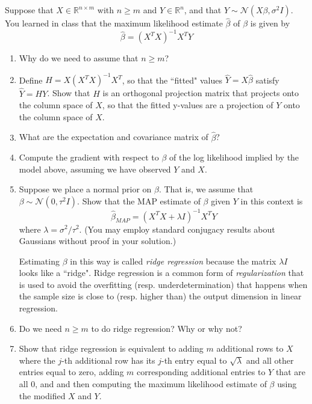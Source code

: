 \documentclass[submit]{harvardml}
\newcommand{\R}{\mathbb{R}}
\newcommand{\N}{\mathcal{N}}
\theoremstyle{plain}
\begin{document}
\begin{problem}
Suppose that $X \in \R^{n \times m}$ with $n \geq m$ and $Y \in \R^n$, and that $Y \sim \N(X\beta, \sigma^2 I)$. You learned in class that the maximum likelihood estimate $\hat\beta$ of $\beta$ is given by
\[
\hat\beta = (X^TX)^{-1}X^TY
\]
\begin{enumerate}[label=(\alph*)]
\item Why do we need to assume that $n \geq m$?
\item Define $H = X(X^TX)^{-1}X^T$, so that the ``fitted" values $\hat Y = X\hat{\beta}$ satisfy $\hat Y = HY$. Show that $H$ is an orthogonal projection matrix that projects onto the column space of $X$, so that the fitted y-values are a projection of $Y$ onto the column space of $X$.
\item What are the expectation and covariance matrix of $\hat\beta$?
\item Compute the gradient with respect to $\beta$ of the log likelihood implied by the model above, assuming we have observed $Y$ and $X$.
\item Suppose we place a normal prior on $\beta$. That is, we assume that $\beta \sim \N(0, \tau^2 I)$. Show that the MAP estimate of $\beta$ given $Y$ in this context is
\[
\hat \beta_{MAP} = (X^TX + \lambda I)^{-1}X^T Y
\]
where $\lambda = \sigma^2 / \tau^2$. (You may employ standard conjugacy results about Gaussians without proof in your solution.)

Estimating $\beta$ in this way is called {\em ridge regression} because the matrix $\lambda I$ looks like a ``ridge". Ridge regression is a common form of {\em regularization} that is used to avoid the overfitting (resp. underdetermination) that happens when the sample size is close to (resp. higher than) the output dimension in linear regression.
\item Do we need $n \geq m$ to do ridge regression? Why or why not?
\item Show that ridge regression is equivalent to adding $m$ additional rows to $X$ where the $j$-th additional row has its $j$-th entry equal to $\sqrt{\lambda}$ and all other entries equal to zero, adding $m$ corresponding additional entries to $Y$ that are all 0, and and then computing the maximum likelihood estimate of $\beta$ using the modified $X$ and $Y$.
\end{enumerate}
\end{problem}
\end{document}
